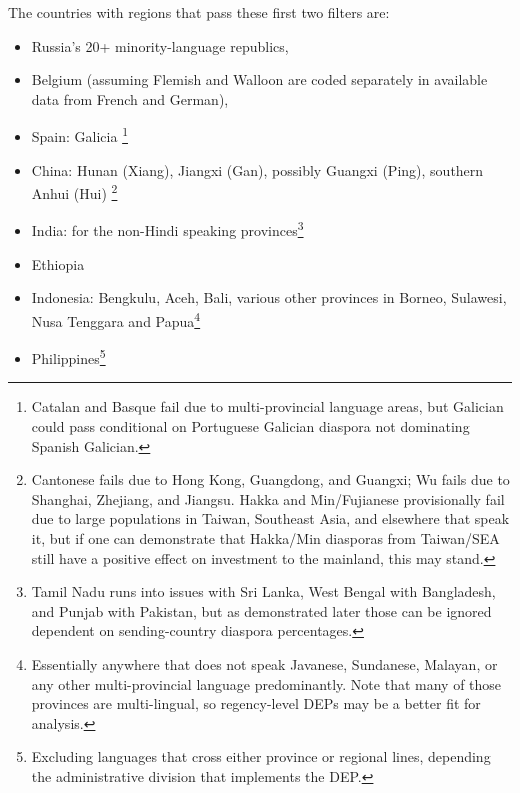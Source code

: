 \documentclass[12pt]{article}
\begin{document}
    The countries with regions that pass these first two filters are:
\begin{itemize}
    \item Russia's 20+ minority-language republics,
    \item Belgium (assuming Flemish and Walloon are coded separately in available data from French and German),
    \item Spain: Galicia \footnote{Catalan and Basque fail due to multi-provincial language areas, but Galician could pass conditional on Portuguese Galician diaspora not dominating Spanish Galician.}
    \item China: Hunan (Xiang), Jiangxi (Gan), possibly Guangxi (Ping), southern Anhui (Hui) \footnote{Cantonese fails due to Hong Kong, Guangdong, and Guangxi; Wu fails due to Shanghai, Zhejiang, and Jiangsu. Hakka and Min/Fujianese provisionally fail due to large populations in Taiwan, Southeast Asia, and elsewhere that speak it, but if one can demonstrate that Hakka/Min diasporas from Taiwan/SEA still have a positive effect on investment to the mainland, this may stand.}
    \item India: for the non-Hindi speaking provinces\footnote{Tamil Nadu runs into issues with Sri Lanka, West Bengal with Bangladesh, and Punjab with Pakistan, but as demonstrated later those can be ignored dependent on sending-country diaspora percentages.} 
    \item Ethiopia
    \item Indonesia: Bengkulu, Aceh, Bali, various other provinces in Borneo, Sulawesi, Nusa Tenggara and Papua\footnote{Essentially anywhere that does not speak Javanese, Sundanese, Malayan, or any other multi-provincial language predominantly. Note that many of those provinces are multi-lingual, so regency-level DEPs may be a better fit for analysis.}
    \item Philippines\footnote{Excluding languages that cross either province or regional lines, depending the administrative division that implements the DEP.}
\end{itemize}
\end{document}
